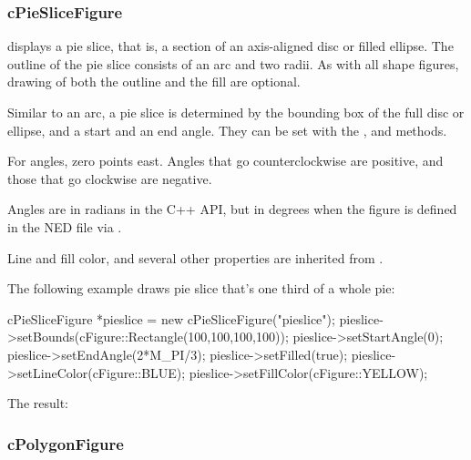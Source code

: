 
\begin{center}

\end{center}


\subsubsection{cPieSliceFigure}
\label{sec:graphics:pieslicefigure}

 displays a pie slice, that is, a section of an
axis-aligned disc or filled ellipse.  The outline of the pie slice consists
of an arc and two radii. As with all shape figures, drawing of both the
outline and the fill are optional.

Similar to an arc, a pie slice is determined by the bounding box of the
full disc or ellipse, and a start and an end angle. They can be set with
the ,  and 
methods.

For angles, zero points east. Angles that go counterclockwise are
positive, and those that go clockwise are negative.

\begin{note}
Angles are in radians in the C++ API, but in degrees when the figure is
defined in the NED file via .
\end{note}

Line and fill color, and several other properties are inherited from
.

The following example draws pie slice that's one third of a whole pie:

\begin{cpp}
cPieSliceFigure *pieslice = new cPieSliceFigure("pieslice");
pieslice->setBounds(cFigure::Rectangle(100,100,100,100));
pieslice->setStartAngle(0);
pieslice->setEndAngle(2*M_PI/3);
pieslice->setFilled(true);
pieslice->setLineColor(cFigure::BLUE);
pieslice->setFillColor(cFigure::YELLOW);
\end{cpp}


The result:

\begin{center}

\end{center}


\subsubsection{cPolygonFigure}
\label{sec:graphics:polygonfigure}

